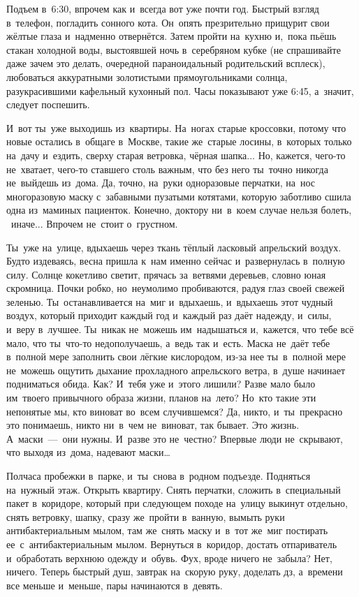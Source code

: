 \chap{***} 
\lettrine[lines=3, loversize=0.1]{П}{}одъем в~6:30, впрочем как и~всегда вот уже почти год.
Быстрый взгляд в~телефон, погладить сонного кота.
Он~опять презрительно прищурит свои жёлтые глаза и~надменно отвернётся.
Затем пройти на~кухню и,~пока пьёшь стакан холодной воды, выстоявшей ночь в~серебряном кубке (не спрашивайте даже зачем это делать, очередной параноидальный родительский всплеск), любоваться аккуратными золотистыми прямоугольниками солнца, разукрасившими кафельный кухонный пол.
Часы показывают уже 6:45, а~значит, следует поспешить.

И~вот ты~уже выходишь из~квартиры.
На~ногах старые кроссовки, потому что новые остались в~общаге в~Москве, такие же~старые лосины, в~которых только на~дачу и~ездить, сверху старая ветровка, чёрная шапка... Но, кажется, чего-то не~хватает, чего-то ставшего столь важным, что без него ты~точно никогда не~выйдешь из~дома.
Да, точно, на~руки одноразовые перчатки, на~нос многоразовую маску с~забавными пузатыми котятами, которую заботливо сшила одна из~маминых пациенток.
Конечно, доктору ни~в~коем случае нельзя болеть, ~иначе...
Впрочем не~стоит о~грустном.

Ты~уже на~улице, вдыхаешь через ткань тёплый ласковый апрельский воздух.
Будто издеваясь, весна пришла к~нам именно сейчас и~развернулась в~полную силу.
Солнце кокетливо светит, прячась за~ветвями деревьев, словно юная скромница.
Почки робко, но~неумолимо пробиваются, радуя глаз своей свежей зеленью.
Ты~останавливается на~миг и~вдыхаешь, и~вдыхаешь этот чудный воздух, который приходит каждый год и~каждый раз даёт надежду, и~силы, и~веру в~лучшее.
Ты~никак не~можешь им~надышаться и,~кажется, что тебе всё мало, что ты~что-то недополучаешь, а~ведь так и~есть.
Маска не~даёт тебе в~полной мере заполнить свои лёгкие кислородом, из-за нее ты~в~полной мере не~можешь ощутить дыхание прохладного апрельского ветра, в~душе начинает подниматься обида.
Как? И~тебя уже и~этого лишили? Разве мало было им~твоего привычного образа жизни, планов на~лето? Но~кто такие эти непонятые мы, кто виноват во~всем случившемся? Да, никто, и~ты~прекрасно это понимаешь, никто ни~в~чем не~виноват, так бывает.
Это жизнь.
А~маски~---~они нужны.
И~разве это не~честно? Впервые люди не~скрывают, что выходя из~дома, надевают маски…

Полчаса пробежки в~парке, и~ты~снова в~родном подъезде.
Подняться на~нужный этаж.
Открыть квартиру.
Снять перчатки, сложить в~специальный пакет в~коридоре, который при следующем походе на~улицу выкинут отдельно, снять ветровку, шапку, сразу же~пройти в~ванную, вымыть руки антибактериальным мылом, там же~снять маску и~в~тот же~миг постирать ее~с~антибактериальным мылом.
Вернуться в~коридор, достать отпариватель и~обработать верхнюю одежду и~обувь.
Фух, вроде ничего не~забыла? Нет, ничего.
Теперь быстрый душ, завтрак на~скорую руку, доделать дз, а~времени все меньше и~меньше, пары начинаются в~девять.

